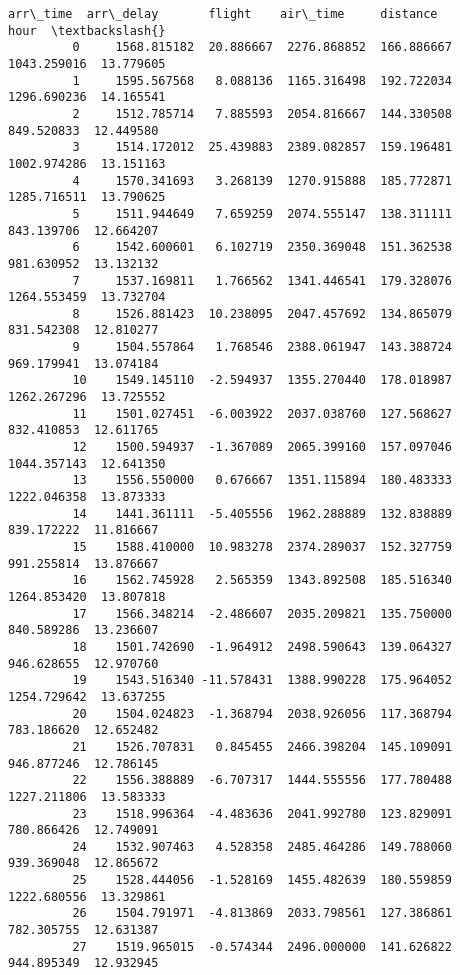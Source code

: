 \documentclass[11pt]{article}
\begin{document}
\begin{Verbatim}[commandchars=\\\{\}]
                  arr\_time  arr\_delay       flight    air\_time     distance       hour  \textbackslash{}
         0     1568.815182  20.886667  2276.868852  166.886667  1043.259016  13.779605   
         1     1595.567568   8.088136  1165.316498  192.722034  1296.690236  14.165541   
         2     1512.785714   7.885593  2054.816667  144.330508   849.520833  12.449580   
         3     1514.172012  25.439883  2389.082857  159.196481  1002.974286  13.151163   
         4     1570.341693   3.268139  1270.915888  185.772871  1285.716511  13.790625   
         5     1511.944649   7.659259  2074.555147  138.311111   843.139706  12.664207   
         6     1542.600601   6.102719  2350.369048  151.362538   981.630952  13.132132   
         7     1537.169811   1.766562  1341.446541  179.328076  1264.553459  13.732704   
         8     1526.881423  10.238095  2047.457692  134.865079   831.542308  12.810277   
         9     1504.557864   1.768546  2388.061947  143.388724   969.179941  13.074184   
         10    1549.145110  -2.594937  1355.270440  178.018987  1262.267296  13.725552   
         11    1501.027451  -6.003922  2037.038760  127.568627   832.410853  12.611765   
         12    1500.594937  -1.367089  2065.399160  157.097046  1044.357143  12.641350   
         13    1556.550000   0.676667  1351.115894  180.483333  1222.046358  13.873333   
         14    1441.361111  -5.405556  1962.288889  132.838889   839.172222  11.816667   
         15    1588.410000  10.983278  2374.289037  152.327759   991.255814  13.876667   
         16    1562.745928   2.565359  1343.892508  185.516340  1264.853420  13.807818   
         17    1566.348214  -2.486607  2035.209821  135.750000   840.589286  13.236607   
         18    1501.742690  -1.964912  2498.590643  139.064327   946.628655  12.970760   
         19    1543.516340 -11.578431  1388.990228  175.964052  1254.729642  13.637255   
         20    1504.024823  -1.368794  2038.926056  117.368794   783.186620  12.652482   
         21    1526.707831   0.845455  2466.398204  145.109091   946.877246  12.786145   
         22    1556.388889  -6.707317  1444.555556  177.780488  1227.211806  13.583333   
         23    1518.996364  -4.483636  2041.992780  123.829091   780.866426  12.749091   
         24    1532.907463   4.528358  2485.464286  149.788060   939.369048  12.865672   
         25    1528.444056  -1.528169  1455.482639  180.559859  1222.680556  13.329861   
         26    1504.791971  -4.813869  2033.798561  127.386861   782.305755  12.631387   
         27    1519.965015  -0.574344  2496.000000  141.626822   944.895349  12.932945   

\end{Verbatim}
\end{document}
